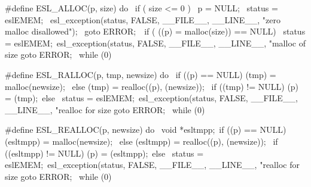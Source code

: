 \begin{cchunk}
#define ESL_ALLOC(p, size) do {\
    if ( size <= 0 ) { \
       p = NULL; \
       status = eslEMEM; \
       esl_exception(status, FALSE, __FILE__, __LINE__, "zero malloc disallowed"); \
       goto ERROR;\
    }\
    if ( ((p) = malloc(size)) == NULL)  { \
       status = eslEMEM;\
       esl_exception(status, FALSE, __FILE__, __LINE__, "malloc of size %
       goto ERROR;\
     }} while (0)

#define ESL_RALLOC(p, tmp, newsize) do {\
     if ((p) == NULL) { (tmp) = malloc(newsize);         }\
     else             { (tmp) = realloc((p), (newsize)); }\
     if ((tmp) != NULL) (p) = (tmp);\
     else {\
       status = eslEMEM;\
       esl_exception(status, FALSE, __FILE__, __LINE__, "realloc for size %
       goto ERROR;\
     }} while (0)

#define ESL_REALLOC(p, newsize) do {\
     void *esltmpp;\
     if ((p) == NULL) { (esltmpp) = malloc(newsize);         }\
     else             { (esltmpp) = realloc((p), (newsize)); }\
     if ((esltmpp) != NULL) (p) = (esltmpp);\
     else {\
       status = eslEMEM;\
       esl_exception(status, FALSE, __FILE__, __LINE__, "realloc for size %
       goto ERROR;\
     }} while (0)
\end{cchunk}
